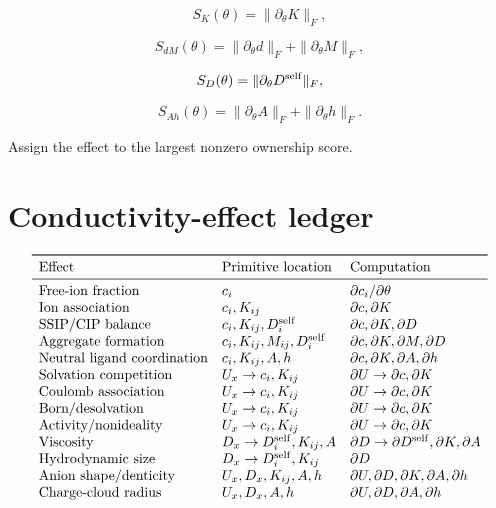 \documentclass[11pt]{article}
\begin{document}
  \[
  S_K(\theta)=\|\partial_\theta K\|_F,
  \]

  \[
  S_{dM}(\theta)=
  \|\partial_\theta d\|_F+\|\partial_\theta M\|_F,
  \]

  \[
  S_{D}(\theta)=\|\partial_\theta D^{\rm self}\|_F,
  \]

  \[
  S_{Ah}(\theta)=\|\partial_\theta A\|_F+\|\partial_\theta h\|_F.
  \]

  Assign the effect to the largest nonzero ownership score.

  \section{Conductivity-effect ledger}

  \[
  \begin{array}{lll}
  \toprule
  \text{Effect} & \text{Primitive location} & \text{Computation}\\
  \midrule
  \text{Free-ion fraction} & c_i & \partial c_i/\partial\theta\\
  \text{Ion association} & c_i,K_{ij} & \partial c,\partial K\\
  \text{SSIP/CIP balance} & c_i,K_{ij},D_i^{\rm self} & \partial c,\partial K,\partial D\\
  \text{Aggregate formation} & c_i,K_{ij},M_{ij},D_i^{\rm self} & \partial c,\partial K,\partial M,\partial D\\
  \text{Neutral ligand coordination} & c_i,K_{ij},A,h & \partial c,\partial K,\partial A,\partial h\\
  \text{Solvation competition} & U_x\to c_i,K_{ij} & \partial U\to\partial c,\partial K\\
  \text{Coulomb association} & U_x\to c_i,K_{ij} & \partial U\to\partial c,\partial K\\
  \text{Born/desolvation} & U_x\to c_i,K_{ij} & \partial U\to\partial c,\partial K\\
  \text{Activity/nonideality} & U_x\to c_i,K_{ij} & \partial U\to\partial c,\partial K\\
  \text{Viscosity} & D_x\to D_i^{\rm self},K_{ij},A & \partial D\to\partial D^{\rm self},\partial K,\partial A\\
  \text{Hydrodynamic size} & D_x\to D_i^{\rm self},K_{ij} & \partial D\\
  \text{Anion shape/denticity} & U_x,D_x,K_{ij},A,h & \partial U,\partial D,\partial K,\partial A,\partial h\\
  \text{Charge-cloud radius} & U_x,D_x,A,h & \partial U,\partial D,\partial A,\partial h\\

\end{array}\]
\end{document}
